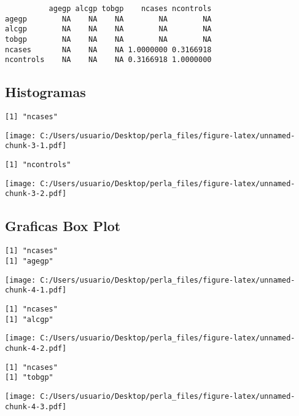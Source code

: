 \documentclass[]{article}
\begin{document}
\begin{verbatim}
          agegp alcgp tobgp    ncases ncontrols
agegp        NA    NA    NA        NA        NA
alcgp        NA    NA    NA        NA        NA
tobgp        NA    NA    NA        NA        NA
ncases       NA    NA    NA 1.0000000 0.3166918
ncontrols    NA    NA    NA 0.3166918 1.0000000
\end{verbatim}

\pagebreak

\subsection{Histogramas}\label{histogramas}

\begin{verbatim}
[1] "ncases"
\end{verbatim}

\texttt{[image: C:/Users/usuario/Desktop/perla\_files/figure-latex/unnamed-chunk-3-1.pdf]}

\begin{verbatim}
[1] "ncontrols"
\end{verbatim}

\texttt{[image: C:/Users/usuario/Desktop/perla\_files/figure-latex/unnamed-chunk-3-2.pdf]}

\subsection{Graficas Box Plot}\label{graficas-box-plot}

\begin{verbatim}
[1] "ncases"
[1] "agegp"
\end{verbatim}

\texttt{[image: C:/Users/usuario/Desktop/perla\_files/figure-latex/unnamed-chunk-4-1.pdf]}

\begin{verbatim}
[1] "ncases"
[1] "alcgp"
\end{verbatim}

\texttt{[image: C:/Users/usuario/Desktop/perla\_files/figure-latex/unnamed-chunk-4-2.pdf]}

\begin{verbatim}
[1] "ncases"
[1] "tobgp"
\end{verbatim}

\texttt{[image: C:/Users/usuario/Desktop/perla\_files/figure-latex/unnamed-chunk-4-3.pdf]}
\end{document}
